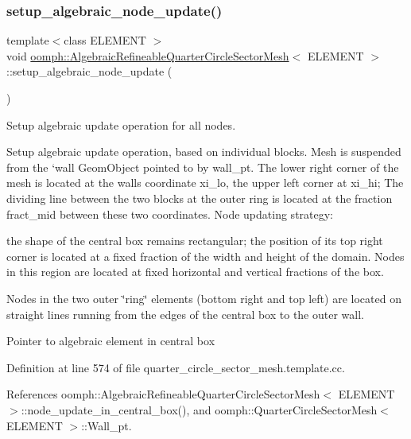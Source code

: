 \subsubsection{\texorpdfstring{setup\+\_\+algebraic\+\_\+node\+\_\+update()}{setup\_algebraic\_node\_update()}}
{\footnotesize\ttfamily template$<$class E\+L\+E\+M\+E\+NT $>$ \\
void \hyperlink{classoomph_1_1AlgebraicRefineableQuarterCircleSectorMesh}{oomph\+::\+Algebraic\+Refineable\+Quarter\+Circle\+Sector\+Mesh}$<$ E\+L\+E\+M\+E\+NT $>$\+::setup\+\_\+algebraic\+\_\+node\+\_\+update (\begin{DoxyParamCaption}{ }\end{DoxyParamCaption})\hspace{0.3cm}{\ttfamily [private]}}



Setup algebraic update operation for all nodes. 

Setup algebraic update operation, based on individual blocks. Mesh is suspended from the `wall\textquotesingle{} Geom\+Object pointed to by wall\+\_\+pt. The lower right corner of the mesh is located at the wall\textquotesingle{}s coordinate xi\+\_\+lo, the upper left corner at xi\+\_\+hi; The dividing line between the two blocks at the outer ring is located at the fraction fract\+\_\+mid between these two coordinates. Node updating strategy\+:
\begin{DoxyItemize}
\item the shape of the central box remains rectangular; the position of its top right corner is located at a fixed fraction of the width and height of the domain. Nodes in this region are located at fixed horizontal and vertical fractions of the box.
\item Nodes in the two outer \char`\"{}ring\char`\"{} elements (bottom right and top left) are located on straight lines running from the edges of the central box to the outer wall. 
\end{DoxyItemize}Pointer to algebraic element in central box 

Definition at line 574 of file quarter\+\_\+circle\+\_\+sector\+\_\+mesh.\+template.\+cc.



References oomph\+::\+Algebraic\+Refineable\+Quarter\+Circle\+Sector\+Mesh$<$ E\+L\+E\+M\+E\+N\+T $>$\+::node\+\_\+update\+\_\+in\+\_\+central\+\_\+box(), and oomph\+::\+Quarter\+Circle\+Sector\+Mesh$<$ E\+L\+E\+M\+E\+N\+T $>$\+::\+Wall\+\_\+pt.




